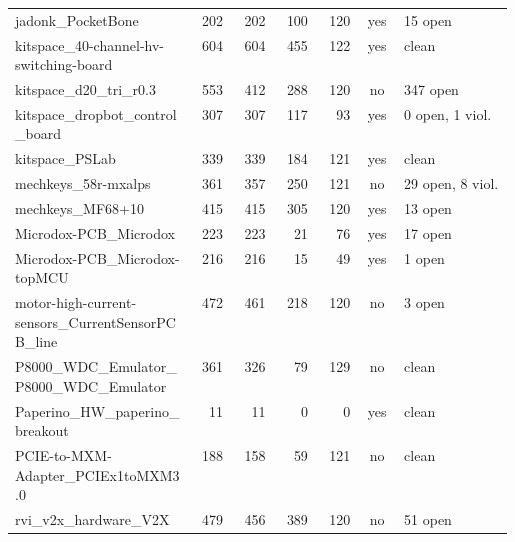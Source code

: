 \begin{longtable}{@{}p{0.36\linewidth}rrrrcp{0.22\linewidth}@{}}
jadonk\_\allowbreak{}PocketBone & 202 & 202 & 100 & 120 & \textcolor{fraqua}{yes} & {\footnotesize 15 open} \\
kitspace\_\allowbreak{}40-\allowbreak{}channel-\allowbreak{}hv-\allowbreak{}switching-\allowbreak{}board & 604 & 604 & 455 & 122 & \textcolor{fraqua}{yes} & {\footnotesize clean} \\
kitspace\_\allowbreak{}d20\_\allowbreak{}tri\_\allowbreak{}r0.3 & 553 & 412 & 288 & 120 & \textcolor{frorange}{no} & {\footnotesize 347 open} \\
kitspace\_\allowbreak{}dropbot\_\allowbreak{}control\_\allowbreak{}board & 307 & 307 & 117 & 93 & \textcolor{fraqua}{yes} & {\footnotesize 0 open, 1 viol.} \\
kitspace\_\allowbreak{}PSLab & 339 & 339 & 184 & 121 & \textcolor{fraqua}{yes} & {\footnotesize clean} \\
mechkeys\_\allowbreak{}58r-\allowbreak{}mxalps & 361 & 357 & 250 & 121 & \textcolor{frorange}{no} & {\footnotesize 29 open, 8 viol.} \\
mechkeys\_\allowbreak{}MF68+10 & 415 & 415 & 305 & 120 & \textcolor{fraqua}{yes} & {\footnotesize 13 open} \\
Microdox-\allowbreak{}PCB\_\allowbreak{}Microdox & 223 & 223 & 21 & 76 & \textcolor{fraqua}{yes} & {\footnotesize 17 open} \\
Microdox-\allowbreak{}PCB\_\allowbreak{}Microdox-\allowbreak{}topMCU & 216 & 216 & 15 & 49 & \textcolor{fraqua}{yes} & {\footnotesize 1 open} \\
motor-\allowbreak{}high-\allowbreak{}current-\allowbreak{}sensors\_\allowbreak{}CurrentSensorPCB\_\allowbreak{}line & 472 & 461 & 218 & 120 & \textcolor{frorange}{no} & {\footnotesize 3 open} \\
P8000\_\allowbreak{}WDC\_\allowbreak{}Emulator\_\allowbreak{}P8000\_\allowbreak{}WDC\_\allowbreak{}Emulator & 361 & 326 & 79 & 129 & \textcolor{frorange}{no} & {\footnotesize clean} \\
Paperino\_\allowbreak{}HW\_\allowbreak{}paperino\_\allowbreak{}breakout & 11 & 11 & 0 & 0 & \textcolor{fraqua}{yes} & {\footnotesize clean} \\
PCIE-\allowbreak{}to-\allowbreak{}MXM-\allowbreak{}Adapter\_\allowbreak{}PCIEx1toMXM3.0 & 188 & 158 & 59 & 121 & \textcolor{frorange}{no} & {\footnotesize clean} \\
rvi\_\allowbreak{}v2x\_\allowbreak{}hardware\_\allowbreak{}V2X & 479 & 456 & 389 & 120 & \textcolor{frorange}{no} & {\footnotesize 51 open} \\

\end{longtable}
